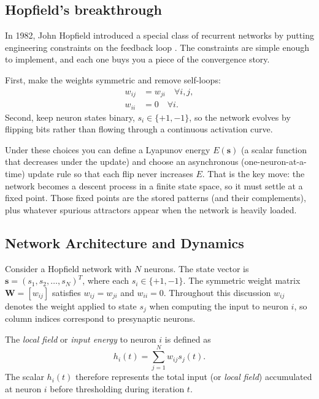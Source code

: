 \subsection{Hopfield's breakthrough}
\label{sec:hopfield_hopfield_s_breakthrough_1982}

In 1982, John Hopfield introduced a special class of recurrent networks by putting engineering constraints on the feedback loop \citep{Hopfield1982}. The constraints are simple enough to implement, and each one buys you a piece of the convergence story.

First, make the weights symmetric and remove self-loops:
\[
\begin{aligned}
    w_{ij} &= w_{ji} \quad \forall i, j,\\
    w_{ii} &= 0 \quad \forall i.
\end{aligned}
\]
Second, keep neuron states binary, \(s_i \in \{+1,-1\}\), so the network evolves by flipping bits rather than flowing through a continuous activation curve.

Under these choices you can define a Lyapunov energy \(E(\mathbf{s})\) (a scalar function that decreases under the update) and choose an asynchronous (one\hyp{}neuron\hyp{}at\hyp{}a\hyp{}time) update rule so that each flip never increases \(E\). That is the key move: the network becomes a descent process in a finite state space, so it must settle at a fixed point. Those fixed points are the stored patterns (and their complements), plus whatever spurious attractors appear when the network is heavily loaded.

\subsection{Network Architecture and Dynamics}
\label{sec:hopfield_network_architecture_and_dynamics}

Consider a Hopfield network with \(N\) neurons. The state vector is \(\mathbf{s} = (s_1, s_2, \ldots, s_N)^T\), where each \(s_i \in \{+1, -1\}\). The symmetric weight matrix \(\mathbf{W} = [w_{ij}]\) satisfies \(w_{ij} = w_{ji}\) and \(w_{ii} = 0\).
Throughout this discussion \(w_{ij}\) denotes the weight applied to state \(s_j\) when computing the input to neuron \(i\), so column indices correspond to presynaptic neurons.

The \emph{local field} or \emph{input energy} to neuron \(i\) is defined as
\[
    h_i(t) = \sum_{j=1}^N w_{ij} s_j(t).
\]
The scalar \(h_i(t)\) therefore represents the total input (or \emph{local field}) accumulated at neuron \(i\) before thresholding during iteration \(t\).


